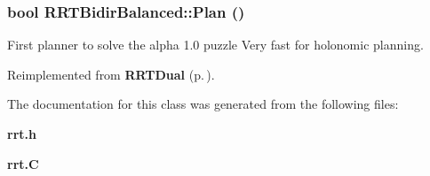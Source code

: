 \subsubsection{\setlength{\rightskip}{0pt plus 5cm}bool RRTBidir\-Balanced::Plan ()\hspace{0.3cm}{\tt  [virtual]}}\label{classRRTBidirBalanced_a2}


First planner to solve the alpha 1.0 puzzle Very fast for holonomic planning.



Reimplemented from {\bf RRTDual} {\rm (p.\,\pageref{classRRTDual_a2})}.

The documentation for this class was generated from the following files:\begin{CompactItemize}
\item 
{\bf rrt.h}\item 
{\bf rrt.C}\end{CompactItemize}
